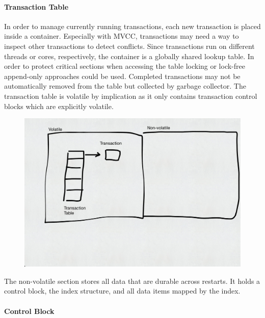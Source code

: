 \paragraph{Transaction Table}

In order to manage currently running transactions, each new transaction is
placed inside a container. Especially with MVCC, transactions may need a way to
inspect other transactions to detect conflicts. Since transactions run on
different threads or cores, respectively, the container is a globally shared
lookup table. In order to protect critical sections when accessing the table
locking or lock-free append-only approaches could be used. Completed
transactions may not be automatically removed from the table but collected by
garbage collector. The transaction table is volatile by implication as it only
contains transaction control blocks which are explicitly volatile.


\begin{figure}[!ht]
    \centering
    \includegraphics[width=\textwidth]{figures/drafts/concept-struct-volatile.pdf}
    \caption{}
    \label{fig:concept-struct-volatile}
\end{figure}

The non-volatile section stores all data that are durable across restarts. It
holds a control block, the index structure, and all data items mapped by the
index.

\paragraph{Control Block}

